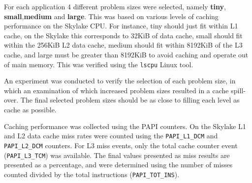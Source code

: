\documentclass[../document.tex]{subfiles}
\begin{document}
\label{ssec:setting_sizes}

For each application 4 different problem sizes were selected, namely {\bf tiny}, {\bf small},{\bf medium} and {\bf large}.
This was based on various levels of caching performance on the Skylake CPU.
For instance, tiny should just fit within L1 cache, on the Skylake this corresponds to 32KiB of data cache, small should fit within the 256KiB L2 data cache, medium should fit within 8192KiB of the L3 cache, and large must be greater than 8192KiB to avoid caching and operate out of main memory.
This was verified using the {\tt lscpu} Linux tool.

An experiment was conducted to verify the selection of each problem size, in which an examination of which increased problem sizes resulted in a cache spill-over.
The final selected problem sizes should be as close to filling each level as cache as possible.

Caching performance was collected using the PAPI counters.
On the Skylake L1 and L2 data cache miss rates were counted using the {\tt PAPI\_L1\_DCM} and {\tt PAPI\_L2\_DCM} counters.
For L3 miss events, only the total cache counter event ({\tt PAPI\_L3\_TCM}) was available.
The final values presented as miss results are presented as a percentage, and were determined using the number of misses counted divided by the total instructions ({\tt PAPI\_TOT\_INS}).
\end{document}
